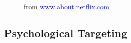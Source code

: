 \documentclass{beamer}
\begin{document}
\begin{frame}
{\begin{figure}
            \caption{from \href{https://about.netflix.com/pl/company-assets}{\textcolor{blue}{www.about.netflix.com}}}
        \end{figure}
    }

\end{frame}

\subsection[Facebook Studies]{Psychological Targeting}
\end{document}
